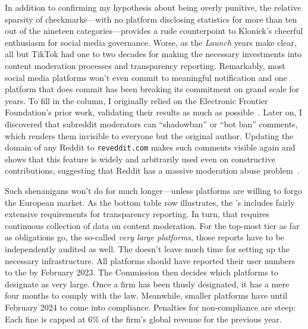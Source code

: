 In addition to confirming my hypothesis about being overly punitive, the
relative sparsity of checkmarks---with no platform disclosing statistics for
more than ten out of the nineteen categories---provides a rude counterpoint to
Klonick's cheerful enthusiasm for social media governance. Worse, as the
\emph{Launch} years make clear, all but TikTok had one to two decades for making
the necessary investments into content moderation processes and transparency
reporting. Remarkably, most social media platforms won't even commit to
meaningful notification and one platform that does commit has been breaking its
commitment on grand scale for years.  To fill in the column, I originally relied
on the Electronic Frontier Foundation's prior work, validating their results as
much as possible~\cite{CrockerGebhartea2019}. Later on, I discovered that
subreddit moderators can ``shadowban'' or ``bot ban'' comments, which renders
them invisible to everyone but the original author. Updating the domain of any
Reddit  to \texttt{reveddit.com} makes such comments visible again and
shows that this feature is widely and arbitrarily used even on constructive
contributions, suggesting that Reddit has a massive moderation abuse
problem~\cite{Hawkins2023}.

Such shenanigans won't do for much longer---unless platforms are willing to
forgo the European market. As the bottom table row illustrates, the 's 
includes fairly extensive requirements for transparency reporting. In turn, that
requires continuous collection of data on content moderation. For the top-most
tier as far as obligations go, the so-called \emph{very large platforms}, those
reports have to be independently audited as well. The  doesn't leave much
time for setting up the necessary infrastructure. All platforms should have
reported their user numbers to the  by February 2023. The Commission then
decides which platforms to designate as very large. Once a firm has been thusly
designated, it has a mere four months to comply with the law. Meanwhile, smaller
platforms have until February 2024 to come into compliance. Penalties for
non-compliance are steep: Each fine is capped at 6\% of the firm's global
revenue for the previous year.

